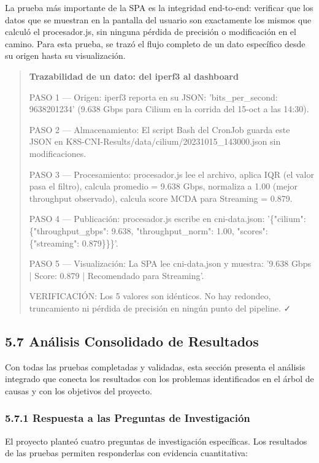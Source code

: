 \documentclass[journal]{IEEEtran}
\begin{document}
La prueba más importante de la SPA es la integridad end-to-end: verificar que los datos que se muestran en la pantalla del usuario son exactamente los mismos que calculó el procesador.js, sin ninguna pérdida de precisión o modificación en el camino. Para esta prueba, se trazó el flujo completo de un dato específico desde su origen hasta su visualización.

\begin{quote}
\textbf{Trazabilidad de un dato: del iperf3 al dashboard}

PASO 1 --- Origen: iperf3 reporta en su JSON: 'bits\_per\_second: 9638201234' (9.638 Gbps para Cilium en la corrida del 15-oct a las 14:30).

PASO 2 --- Almacenamiento: El script Bash del CronJob guarda este JSON en K8S-CNI-Results/data/cilium/20231015\_143000.json sin modificaciones.

PASO 3 --- Procesamiento: procesador.js lee el archivo, aplica IQR (el valor pasa el filtro), calcula promedio = 9.638 Gbps, normaliza a 1.00 (mejor throughput observado), calcula score MCDA para Streaming = 0.879.

PASO 4 --- Publicación: procesador.js escribe en cni-data.json: '\{"cilium": \{"throughput\_gbps": 9.638, "throughput\_norm": 1.00, "scores": \{"streaming": 0.879\}\}\}'.

PASO 5 --- Visualización: La SPA lee cni-data.json y muestra: '9.638 Gbps | Score: 0.879 | Recomendado para Streaming'.

VERIFICACIÓN: Los 5 valores son idénticos. No hay redondeo, truncamiento ni pérdida de precisión en ningún punto del pipeline. ✓
\end{quote}

\subsection{5.7 Análisis Consolidado de Resultados}

Con todas las pruebas completadas y validadas, esta sección presenta el análisis integrado que conecta los resultados con los problemas identificados en el árbol de causas y con los objetivos del proyecto.

\subsubsection{5.7.1 Respuesta a las Preguntas de Investigación}

El proyecto planteó cuatro preguntas de investigación específicas. Los resultados de las pruebas permiten responderlas con evidencia cuantitativa:
\end{document}
